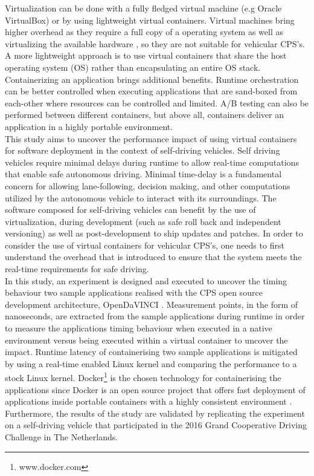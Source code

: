 Virtualization can be done with a fully fledged virtual machine (e.g Oracle VirtualBox) or by using lightweight virtual containers. Virtual machines bring higher overhead as they require a full copy of a operating system as well as virtualizing the available hardware \cite{anderson2015docker}, so they are not suitable for vehicular CPS's. A more lightweight approach is to use virtual containers that share the host operating system (OS) rather than encapsulating an entire OS stack. Containerizing an application brings additional benefits. Runtime orchestration can be better controlled when executing applications that are sand-boxed from each-other where resources can be controlled and limited. A/B testing can also be performed between different containers, but above all, containers deliver an application in a highly portable environment.\\

This study aims to uncover the performance impact of using virtual containers for software deployment in the context of self-driving vehicles. Self driving vehicles require minimal delays during runtime to allow real-time computations that enable safe autonomous driving. Minimal time-delay is a fundamental concern for allowing lane-following, decision making, and other computations utilized by the autonomous vehicle to interact with its surroundings. The software composed for self-driving vehicles can benefit by the use of virtualization, during development (such as safe roll back and independent versioning) as well as post-development to ship updates and patches. In order to consider the use of virtual containers for vehicular CPS's, one needs to first understand the overhead that is introduced to ensure that the system meets the real-time requirements for safe driving.\\

In this study, an experiment is designed and executed to uncover the timing behaviour two sample applications realised with the CPS open source development architecture, OpenDaVINCI \cite{OpenDaVINCI}. Measurement points, in the form of nanoseconds, are extracted from the sample applications during runtime in order to measure the applications timing behaviour when executed in a native environment versus being executed within a virtual container to uncover the impact. Runtime latency of containerising two sample applications is mitigated by using a real-time enabled Linux kernel and comparing the performance to a stock Linux kernel. Docker\footnote{www.docker.com} is the chosen technology for containerising the applications since Docker is an open source project that offers fast deployment of applications inside portable containers with a highly consistent environment \cite{bernstein2014containers}. Furthermore, the results of the study are validated by replicating the experiment on a self-driving vehicle that participated in the 2016 Grand Cooperative Driving Challenge in The Netherlands.

